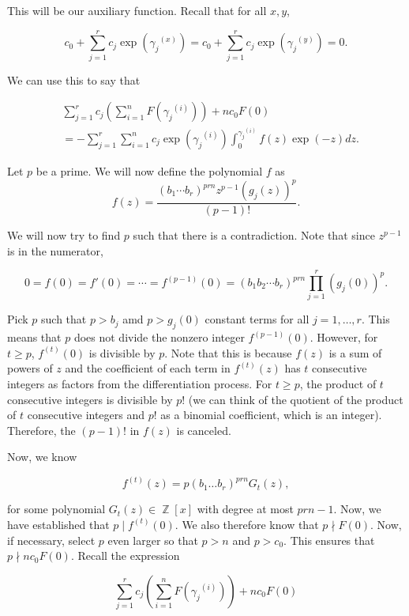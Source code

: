 \documentclass[a4paper, 11pt]{book}
\DeclareMathOperator{\Z}{\mathbb{Z}}
\begin{document}
{    This will be our auxiliary function. Recall that for all $x, y$,

    \[c_0 + \sum\limits_{j=1}^{r} c_j\exp({\gamma_j}^{(x)}) = c_0 + \sum\limits_{j=1}^{r} c_j\exp({\gamma_j}^{(y)}) = 0.\]

    We can use this to say that

    \begin{align*}
    &\sum\limits_{j=1}^{r}c_j\left(\sum\limits_{i=1}^{n} F({\gamma_j}^{(i)})\right) + nc_0F(0) \\
    &= - \sum\limits_{j=1}^{r} \sum\limits_{i=1}^{n} c_j\exp\left({\gamma_j}^{(i)}\right) \int_{0}^{{\gamma_j}^{(i)}} f(z) \exp(-z) dz.
    \end{align*}

    Let $p$ be a prime. We will now define the polynomial $f$ as 
    \[f(z) = \frac{{(b_1\cdots b_r)}^{prn}z^{p-1}{\left(g_j(z)\right)}^{p}}{(p-1)!}.\]

    We will now try to find $p$ such that there is a contradiction. Note that since $z^{p-1}$ is in the numerator, 

    \[0 = f(0) = f'(0) = \cdots = f^{(p-1)}(0) = {(b_1b_2\cdots b_r)}^{prn}\prod\limits_{j=1}^{r} {\left(g_j(0)\right)}^{p}.\]

    Pick $p$ such that $p > b_j$ amd $p > g_j(0)$ constant terms for all $j = 1, \ldots, r$. This means that $p$ does not divide the nonzero integer $f^{(p-1)}(0)$. However, for $t \geq p$, $f^{(t)}(0)$ is divisible by $p$. Note that this is because $f(z)$ is a sum of powers of $z$ and the coefficient of each term in $f^{(t)}(z)$ has $t$ consecutive integers as factors from the differentiation process. For $t \geq p$, the product of $t$ consecutive integers is divisible by ${p!}$ (we can think of the quotient of the product of $t$ consecutive integers and ${p!}$ as a binomial coefficient, which is an integer). Therefore, the ${(p-1)!}$ in $f(z)$ is canceled.\par

    Now, we know 

    \[f^{(t)}(z) = p{(b_1\ldots b_r)}^{prn} G_t(z),\]

    for some polynomial $G_t(z) \in \Z[x]$ with degree at most $prn-1$. Now, we have established that $p \mid f^{(t)}(0)$. We also therefore know that $p \nmid F(0)$. Now, if necessary, select $p$ even larger so that $p > n$ and $p > c_0$. This ensures that $p \nmid nc_0F(0)$. Recall the expression 

    \[\sum\limits_{j=1}^{r}c_j\left(\sum\limits_{i=1}^{n} F({\gamma_j}^{(i)})\right) + nc_0F(0) \]

}
\end{document}
